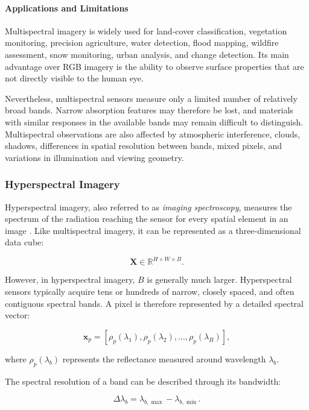 \documentclass[11pt,a4paper]{article}
\begin{document}
\paragraph{Applications and Limitations}

Multispectral imagery is widely used for land-cover classification,
vegetation monitoring, precision agriculture, water detection, flood
mapping, wildfire assessment, snow monitoring, urban analysis, and
change detection. Its main advantage over RGB imagery is the ability to
observe surface properties that are not directly visible to the human
eye.

Nevertheless, multispectral sensors measure only a limited number of
relatively broad bands. Narrow absorption features may therefore be
lost, and materials with similar responses in the available bands may
remain difficult to distinguish. Multispectral observations are also
affected by atmospheric interference, clouds, shadows, differences in
spatial resolution between bands, mixed pixels, and variations in
illumination and viewing geometry.

\subsubsection{Hyperspectral Imagery}

Hyperspectral imagery, also referred to as
\textit{imaging spectroscopy}, measures the spectrum of the radiation
reaching the sensor for every spatial element in an image
\cite{jpl_imaging_spectroscopy}. Like multispectral imagery, it can be
represented as a three-dimensional data cube:

\[
\mathbf{X}
\in
\mathbb{R}^{H \times W \times B}.
\]

However, in hyperspectral imagery, \(B\) is generally much larger.
Hyperspectral sensors typically acquire tens or hundreds of narrow,
closely spaced, and often contiguous spectral bands. A pixel is therefore
represented by a detailed spectral vector:

\[
\mathbf{x}_p =
\left[
\rho_p(\lambda_1),
\rho_p(\lambda_2),
\ldots,
\rho_p(\lambda_B)
\right],
\]

where \(\rho_p(\lambda_b)\) represents the reflectance measured around
wavelength \(\lambda_b\).

The spectral resolution of a band can be described through its bandwidth:

\[
\Delta\lambda_b
=
\lambda_{b,\max}
-
\lambda_{b,\min}.
\]
\end{document}
